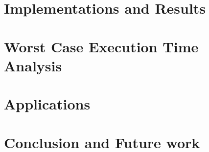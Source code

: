 \documentclass[11pt]{ucthesis}
\begin{document}
\chapter{Implementations and Results}
\label{chapter:implementation}


\chapter{Worst Case Execution Time Analysis}
\label{chapter:pret_wcet}


\chapter{Applications}
\label{chapter:app}


\chapter{Conclusion and Future work}
\label{chapter:summary}



  

\end{document}
